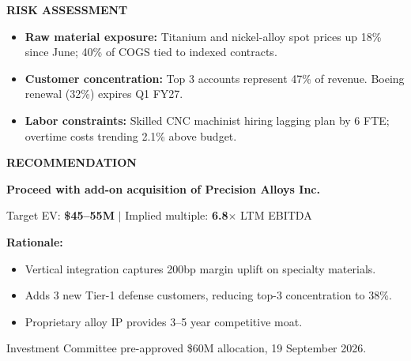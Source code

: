 \documentclass[10pt,letterpaper]{article}
\newcommand{\sectiontitle}[1]{%
  \vspace{2pt}%
  {\color{navy}\bfseries\footnotesize\MakeUppercase{#1}}%
  \vspace{2pt}%
}
\begin{document}
\begin{minipage}[t]{0.48\textwidth}
  \sectiontitle{Risk Assessment}

  \vspace{2pt}
  \begin{riskcallout}
    \begin{itemize}[leftmargin=10pt, itemsep=1pt]
      \item[\color{riskred}\faExclamationTriangle]
        \textbf{Raw material exposure:} Titanium and nickel-alloy spot prices
        up 18\% since June; 40\% of COGS tied to indexed contracts.
      \item[\color{riskred}\faExclamationTriangle]
        \textbf{Customer concentration:} Top 3 accounts represent 47\% of
        revenue. Boeing renewal (32\%) expires Q1 FY27.
      \item[\color{riskred}\faExclamationTriangle]
        \textbf{Labor constraints:} Skilled CNC machinist hiring lagging plan
        by 6 FTE; overtime costs trending 2.1\% above budget.
    \end{itemize}
  \end{riskcallout}
\end{minipage}
\hfill
\begin{minipage}[t]{0.48\textwidth}
  \sectiontitle{Recommendation}

  \vspace{2pt}
  \begin{reccallout}
    \textbf{Proceed with add-on acquisition of Precision Alloys Inc.}

    \vspace{2pt}
    {\footnotesize Target EV: \textbf{\$45--55M} \enspace$|$\enspace
     Implied multiple: \textbf{6.8$\times$} LTM EBITDA}

    \vspace{3pt}
    \textbf{Rationale:}
    \begin{itemize}[leftmargin=10pt, itemsep=1pt]
      \item Vertical integration captures 200bp margin uplift
        on specialty materials.
      \item Adds 3 new Tier-1 defense customers, reducing top-3
        concentration to 38\%.
      \item Proprietary alloy IP provides 3--5 year competitive moat.
    \end{itemize}

    \vspace{2pt}
    {\footnotesize\color{accentgreen}\faCheckCircle\enspace
     Investment Committee pre-approved \$60M allocation, 19 September 2026.}
  \end{reccallout}
\end{minipage}
\end{document}
